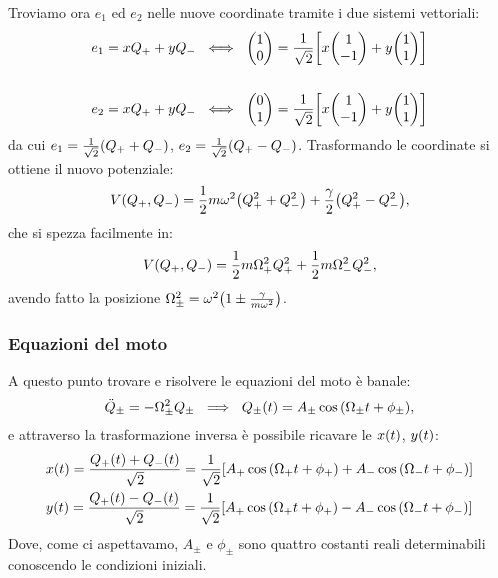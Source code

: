             Troviamo ora $e_1$ ed $e_2$ nelle nuove coordinate tramite i due sistemi vettoriali:
            \begin{align*}
                e_1=xQ_++yQ_-\ & \iff\ \mqty(1 \\ 0)=\frac{1}{\sqrt{2}}\qty[x\mqty(1 \\ -1)+y\mqty(1 \\ 1)] \\\\
                e_2=xQ_++yQ_-\ & \iff\ \mqty(0 \\ 1)=\frac{1}{\sqrt{2}}\qty[x\mqty(1 \\ -1)+y\mqty(1 \\ 1)] 
            \end{align*}
            da cui $e_1=\frac{1}{\sqrt{2}}\qty(Q_++Q_-)$, $e_2=\frac{1}{\sqrt{2}}\qty(Q_+-Q_-)$. Trasformando le coordinate si ottiene il nuovo potenziale:
                $$V\qty(Q_+,Q_-)=\frac{1}{2}m\omega^2\qty(Q_+^2+Q_-^2)+\frac{\gamma}{2}\qty(Q_+^2-Q_-^2),$$
            che si spezza facilmente in:
                $$V\qty(Q_+,Q_-)=\frac{1}{2}m\Omega_+^2Q_+^2+\frac{1}{2}m\Omega_-^2Q_-^2,$$
            avendo fatto la posizione $\Omega_\pm^2=\omega^2\qty(1\pm\frac{\gamma}{m\omega^2})$.
        \subsubsection{Equazioni del moto}
            A questo punto trovare e risolvere le equazioni del moto \`e banale:
                $$\ddot{Q}_\pm=-\Omega_\pm^2Q_\pm\ \implies\ Q_\pm\qty(t)=A_\pm\cos\qty(\Omega_\pm t+\phi_\pm),$$
            e attraverso la trasformazione inversa \`e possibile ricavare le $x\qty(t)$, $y\qty(t)$:
            \begin{align*}
                & x\qty(t)=\frac{Q_+\qty(t)+Q_-\qty(t)}{\sqrt{2}}=\frac{1}{\sqrt{2}}\qty[A_+\cos\qty(\Omega_+t+\phi_+)+A_-\cos\qty(\Omega_-t+\phi_-)] \\
                & y\qty(t)=\frac{Q_+\qty(t)-Q_-\qty(t)}{\sqrt{2}}=\frac{1}{\sqrt{2}}\qty[A_+\cos\qty(\Omega_+t+\phi_+)-A_-\cos\qty(\Omega_-t+\phi_-)]
            \end{align*}
            Dove, come ci aspettavamo, $A_\pm$ e $\phi_\pm$ sono quattro costanti reali determinabili conoscendo le condizioni iniziali.
